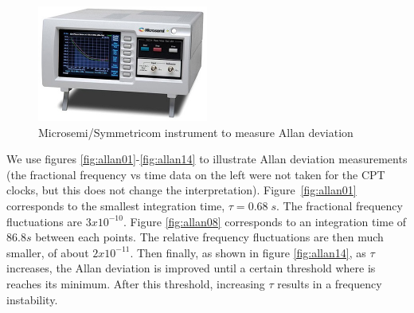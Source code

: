 \documentclass[a4paper,12pt]{article}
\begin{document}
\begin{figure}[!h]
    \centering
    \includegraphics[width=0.5\textwidth]{Images/5125A.jpg}
    \captionsetup{justification=centering}
    \caption{Microsemi\slash Symmetricom instrument to measure Allan deviation} 
    \label{fig:5125A}
\end{figure}

We use figures \ref{fig:allan01}-\ref{fig:allan14} to illustrate Allan deviation measurements (the fractional frequency vs time data on the left were not taken for the CPT clocks, but this does not change the interpretation). \mbox{Figure \ref{fig:allan01}} corresponds to the smallest integration time, $\tau = 0.68\; s$. The fractional frequency fluctuations are $3x10^{-10}$. Figure \ref{fig:allan08} corresponds to an integration time of $86.8 s$ between each points. The relative frequency fluctuations are then much smaller, of about $2x10^{-11}$. Then finally, as shown in figure \ref{fig:allan14}, as $\tau$ increases, the Allan deviation is improved until a certain threshold where is reaches its minimum. After this threshold, increasing $\tau$ results in a frequency instability.
\end{document}
